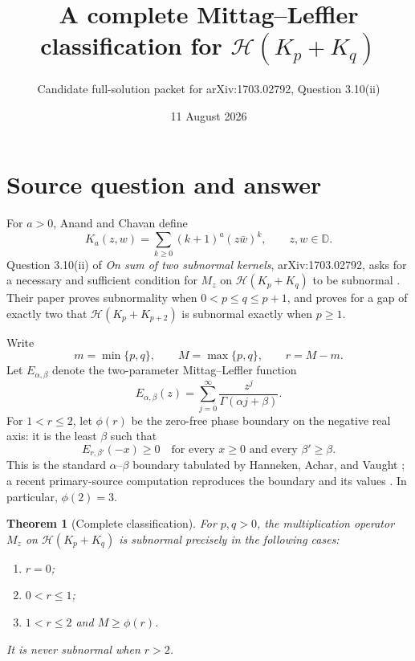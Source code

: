 \documentclass[11pt]{article}
\title{A complete Mittag--Leffler classification for \texorpdfstring{$\mathcal H(K_p+K_q)$}{H(Kp+Kq)}}
\author{Candidate full-solution packet for arXiv:1703.02792, Question 3.10(ii)}
\date{11 August 2026}
\newtheorem{theorem}{Theorem}
\newcommand{\D}{\mathbb D}
\newcommand{\cH}{\mathcal H}
\begin{document}
\maketitle

\begin{center}
\end{center}

\section{Source question and answer}

For $a>0$, Anand and Chavan define
\[
 K_a(z,w)=\sum_{k\geq0}(k+1)^a(z\bar w)^k,\qquad z,w\in\D.
\]
Question 3.10(ii) of \emph{On sum of two subnormal kernels},
arXiv:1703.02792, asks for a necessary and sufficient condition for
$M_z$ on $\cH(K_p+K_q)$ to be subnormal \cite{source}.  Their paper proves
subnormality when $0<p\leq q\leq p+1$, and proves for a gap of exactly two
that $\cH(K_p+K_{p+2})$ is subnormal exactly when $p\geq1$.

Write
\[
 m=\min\{p,q\},\qquad M=\max\{p,q\},\qquad r=M-m.
\]
Let $E_{\alpha,\beta}$ denote the two-parameter Mittag--Leffler function
\[
 E_{\alpha,\beta}(z)=\sum_{j=0}^{\infty}
 \frac{z^j}{\Gamma(\alpha j+\beta)}.
\]
For $1<r\leq2$, let $\phi(r)$ be the zero-free phase boundary on the
negative real axis: it is the least $\beta$ such that
\[
 E_{r,\beta'}(-x)\geq0
 \quad\text{for every }x\geq0\text{ and every }\beta'\geq\beta.
\tag{1}\label{eq:phi}
\]
This is the standard $\alpha$--$\beta$ boundary tabulated by Hanneken,
Achar, and Vaught \cite{phase}; a recent primary-source computation
reproduces the boundary and its values \cite{honain}.  In particular,
$\phi(2)=3$.

\begin{theorem}[Complete classification]\label{thm:classification}
For $p,q>0$, the multiplication operator $M_z$ on $\cH(K_p+K_q)$ is
subnormal precisely in the following cases:
\begin{enumerate}
\item $r=0$;
\item $0<r\leq1$;
\item $1<r\leq2$ and $M\geq\phi(r)$.
\end{enumerate}
It is never subnormal when $r>2$.
\end{theorem}
\end{document}
